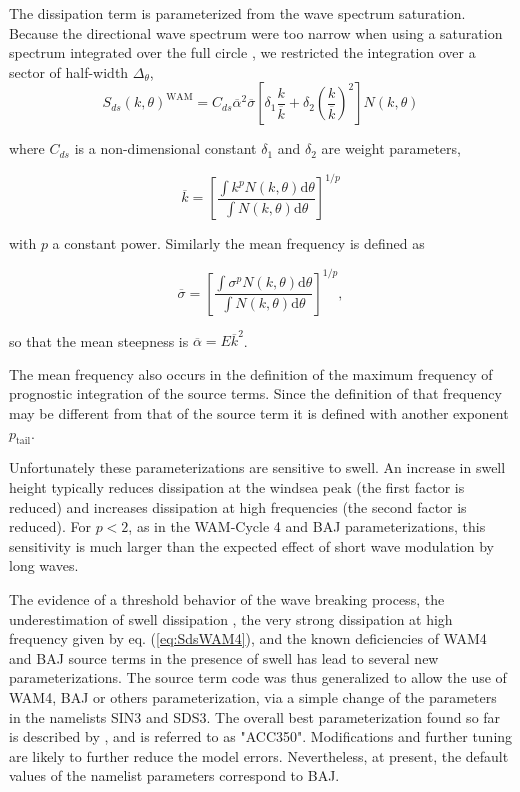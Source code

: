 \noindent
The dissipation term is parameterized from the wave spectrum saturation. Because the directional wave spectrum 
were too narrow when using a 
saturation spectrum integrated over the full circle \citep{art:AL06},
we restricted the integration over a sector of half-width $\Delta_\theta$, 
\begin{equation}
S_{ds}\left(k,\theta\right)^{\mathrm{WAM}} = C_{ds} \overline{\alpha}^2
 \overline{\sigma} \left[\delta_1 \frac{k}{\overline{k}} + \delta_2
\left(\frac{k}{\overline{k}}\right)^2\right]\label{eq:SdsWAM4}
N\left(k,\theta\right)
\end{equation}

\noindent
where $C_{ds}$ is a non-dimensional constant $\delta_1$ and $\delta_2$ are
weight parameters,

\begin{equation}
\overline{k}=\left[\frac{\int k^p N\left(k,\theta\right) {\mathrm d}
\theta}{\int N\left(k,\theta\right) {\mathrm d} \theta}\right]^{1/p}
\end{equation}

\noindent
with $p$ a constant power. Similarly the mean frequency is defined as

\begin{equation}
\overline{\sigma}=\left[\frac{\int \sigma^p N\left(k,\theta\right) {\mathrm d}
\theta}{ \int N\left(k,\theta\right) {\mathrm d} \theta}\right]^{1/p},
\end{equation}

\noindent
so that the mean steepness is $\overline{\alpha}=E \overline{k}^2$.

The mean frequency also occurs in the definition of the maximum frequency of
prognostic integration of the source terms. Since the definition of that
frequency may be different from that of the source term it is defined with
another exponent $p_{\mathrm{tail}}$.

Unfortunately these parameterizations are sensitive to swell. An increase in
swell height typically reduces dissipation at the windsea peak (the first
factor is reduced) and increases dissipation at high frequencies (the second
factor is reduced). For $p< 2$, as in the WAM-Cycle 4 and BAJ
parameterizations, this sensitivity is much larger than the expected effect of
short wave modulation by long waves.

The evidence of a threshold behavior of the wave breaking process, the
underestimation of swell dissipation \citep{tol:OMB02a}, the very strong
dissipation at high frequency given by eq. (\ref{eq:SdsWAM4}), and the known
deficiencies of WAM4 and BAJ source terms in the presence of swell has lead to
several new parameterizations. The source term code was thus generalized to
allow the use of WAM4, BAJ or others parameterization, via a simple change of
the parameters in the namelists SIN3 and SDS3. The overall best
parameterization found so far is described by \cite{art:ACC08}, and is referred
to as "ACC350". Modifications and further tuning are likely to further reduce
the model errors. Nevertheless, at present, the default values of the namelist
parameters correspond to BAJ.

